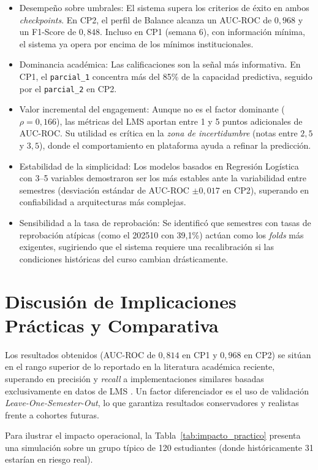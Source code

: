 \documentclass[12pt, letterpaper, openany]{report}
\begin{document}
\begin{itemize}
    \item Desempeño sobre umbrales: El sistema supera los criterios de éxito en ambos \textit{checkpoints}. En CP2, el perfil de Balance alcanza un AUC-ROC de $0{,}968$ y un F1-Score de $0{,}848$. Incluso en CP1 (semana 6), con información mínima, el sistema ya opera por encima de los mínimos institucionales.
    \item Dominancia académica: Las calificaciones son la señal más informativa. En CP1, el \texttt{parcial\_1} concentra más del 85\% de la capacidad predictiva, seguido por el \texttt{parcial\_2} en CP2.
    \item Valor incremental del engagement: Aunque no es el factor dominante ($\rho = 0{,}166$), las métricas del LMS aportan entre 1 y 5 puntos adicionales de AUC-ROC. Su utilidad es crítica en la \textit{zona de incertidumbre} (notas entre $2{,}5$ y $3{,}5$), donde el comportamiento en plataforma ayuda a refinar la predicción.
    \item Estabilidad de la simplicidad: Los modelos basados en Regresión Logística con 3--5 variables demostraron ser los más estables ante la variabilidad entre semestres (desviación estándar de AUC-ROC $\pm 0{,}017$ en CP2), superando en confiabilidad a arquitecturas más complejas.
    \item Sensibilidad a la tasa de reprobación: Se identificó que semestres con tasas de reprobación atípicas (como el 202510 con 39,1\%) actúan como los \textit{folds} más exigentes, sugiriendo que el sistema requiere una recalibración si las condiciones históricas del curso cambian drásticamente.
\end{itemize}

\section{Discusión de Implicaciones Prácticas y Comparativa}

Los resultados obtenidos (AUC-ROC de $0{,}814$ en CP1 y $0{,}968$ en CP2) se sitúan en el rango superior de lo reportado en la literatura académica reciente, superando en precisión y \textit{recall} a implementaciones similares basadas exclusivamente en datos de LMS \cite{Macfadyen2010, Romero2020}. Un factor diferenciador es el uso de validación \textit{Leave-One-Semester-Out}, lo que garantiza resultados conservadores y realistas frente a cohortes futuras.

Para ilustrar el impacto operacional, la Tabla~\ref{tab:impacto_practico} presenta una simulación sobre un grupo típico de 120 estudiantes (donde históricamente 31 estarían en riesgo real).
\end{document}
